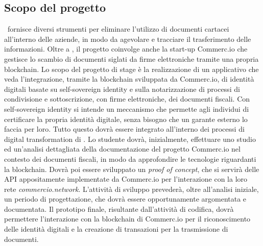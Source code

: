
\subsection{Scopo del progetto}
	\ragioneSocAzienda\ fornisce diversi strumenti per eliminare l'utilizzo di documenti cartacei all’interno delle aziende, in modo da agevolare e tracciare il trasferimento delle informazioni. Oltre a \ragioneSocAzienda, il progetto coinvolge anche la start-up Commerc.io che gestisce lo scambio di documenti siglati da firme elettroniche tramite una propria blockchain.
	\newline
	Lo scopo del progetto di stage è la realizzazione di un applicativo che veda l'integrazione, tramite la blockchain sviluppata da Commerc.io, di identità digitali basate su self-sovereign identity e sulla notarizzazione di processi di condivisione e sottoscrizione, con firme elettroniche, dei documenti fiscali.
	\newline
	Con self-sovereign identity si intende un meccanismo che permette agli individui di certificare la propria identità digitale, senza bisogno che un garante esterno lo faccia per loro.
	\newline
	Tutto questo dovrà essere integrato all'interno dei processi di digital transformation di \ragioneSocAzienda.
	\newline
	Lo studente dovrà, inizialmente, effettuare uno studio ed un'analisi dettagliata della documentazione del progetto Commerc.io nel contesto dei documenti fiscali, in modo da approfondire le tecnologie riguardanti la blockchain. Dovrà poi essere sviluppato un \textit{proof of concept}, che si servirà delle API appositamente implementate da Commerc.io per l'interazione con la loro rete \textit{commercio.network}.
	\newline
	L'attività di sviluppo prevederà, oltre all'analisi iniziale, un periodo di progettazione, che dovrà essere opportunamente argomentata e documentata. Il prototipo finale, risultante dall'attività di codifica, dovrà permettere l'interazione con la blockchain di Commerc.io per il riconoscimento delle identità digitali e la creazione di transazioni per la trasmissione di documenti.